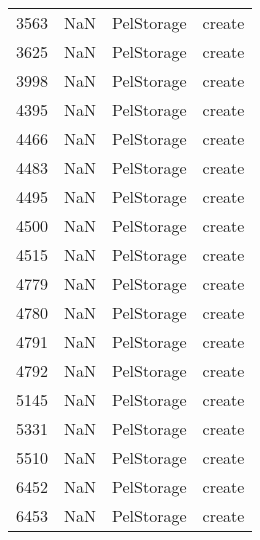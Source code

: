 \begin{tabular}{llll}
3563 &                   NaN &                 PelStorage &                                    create \\
3625 &                   NaN &                 PelStorage &                                    create \\
3998 &                   NaN &                 PelStorage &                                    create \\
4395 &                   NaN &                 PelStorage &                                    create \\
4466 &                   NaN &                 PelStorage &                                    create \\
4483 &                   NaN &                 PelStorage &                                    create \\
4495 &                   NaN &                 PelStorage &                                    create \\
4500 &                   NaN &                 PelStorage &                                    create \\
4515 &                   NaN &                 PelStorage &                                    create \\
4779 &                   NaN &                 PelStorage &                                    create \\
4780 &                   NaN &                 PelStorage &                                    create \\
4791 &                   NaN &                 PelStorage &                                    create \\
4792 &                   NaN &                 PelStorage &                                    create \\
5145 &                   NaN &                 PelStorage &                                    create \\
5331 &                   NaN &                 PelStorage &                                    create \\
5510 &                   NaN &                 PelStorage &                                    create \\
6452 &                   NaN &                 PelStorage &                                    create \\
6453 &                   NaN &                 PelStorage &                                    create \\

\end{tabular}
